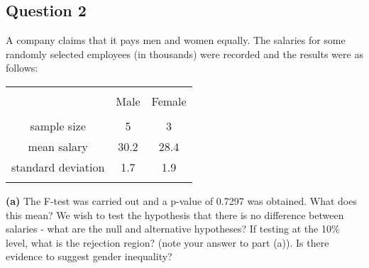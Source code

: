 
\subsection*{Question 2}
A company claims that it pays men and women equally. The salaries for some randomly selected employees (in thousands) were recorded and the results were as follows:\\[-0.2cm]
\begin{center}
\begin{tabular}{|c|c|c|}
\hline
&&\\[-0.4cm]
& Male & Female \\
\hline
&&\\[-0.4cm]
sample size & 5 & 3 \\
mean salary & 30.2 & 28.4 \\
standard deviation & 1.7 & 1.9 \\
\hline
\multicolumn{3}{c}{}\\[-0.3cm]
\end{tabular}
\end{center}

{\bf(a)} The F-test was carried out and a p-value of 0.7297 was obtained. What does this mean? 
 We wish to test the hypothesis that there is no difference between salaries - what are the null and alternative hypotheses?  If testing at the 10\% level, what is the rejection region? (note your answer to part (a)).  Is there evidence to suggest gender inequality?


